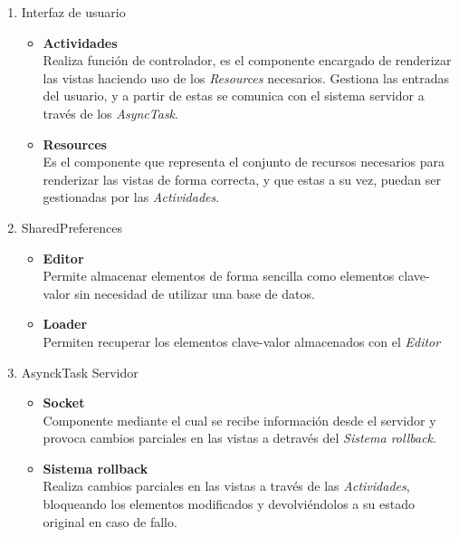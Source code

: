 \documentclass[12pt]{article}
\begin{document}
            \begin{enumerate}
                \item Interfaz de usuario
                    \begin{itemize}
                        \item \textbf{Actividades} \\
                            Realiza función de controlador, es el componente encargado de renderizar las vistas haciendo uso de los \textit{Resources} necesarios. Gestiona las entradas del usuario, y a partir de estas se comunica con el sistema servidor a través de los \textit{AsyncTask}.
                        \item \textbf{Resources} \\ 
                            Es el componente que representa el conjunto de recursos necesarios para renderizar las vistas de forma correcta, y que estas a su vez, puedan ser gestionadas por las \textit{Actividades}.
                    \end{itemize}
                \item SharedPreferences
                    \begin{itemize}
                        \item \textbf{Editor} \\ 
                            Permite almacenar elementos de forma sencilla como elementos clave-valor sin necesidad de utilizar una base de datos.
                        \item \textbf{Loader} \\
                            Permiten recuperar los elementos clave-valor almacenados con el \textit{Editor}
                    \end{itemize}
                \item AsynckTask Servidor
                    \begin{itemize}
                        \item \textbf{Socket} \\ 
                            Componente mediante el cual se recibe información desde el servidor y provoca cambios parciales en las vistas a detravés del \textit{Sistema rollback}.
                        \item \textbf{Sistema rollback} \\
                            Realiza cambios parciales en las vistas a través de las \textit{Actividades}, bloqueando los elementos modificados y devolviéndolos a su estado original en caso de fallo.

\end{itemize}
\end{enumerate}
\end{document}
